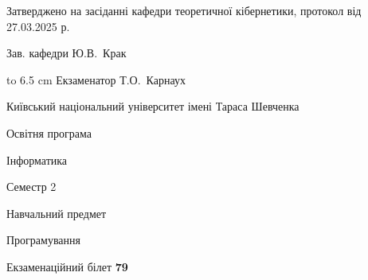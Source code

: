 \documentclass[12pt, ukrainian]{article}
\begin{document}
{\smallskip\smallskip \begin {scriptsize} Затверджено на засіданні кафедри теоретичної кібернетики, протокол   від   27.03.2025 р.\par\smallskip\smallskip\smallskip\smallskip
{\parbox {6.5 cm} {Зав. кафедри \dotfill Ю.В.~Крак}}\hspace {0.7cm} {\hbox to 6.5 cm { Екзаменатор \dotfill Т.О.~Карнаух}} \end{scriptsize}}
\newpage
{{\begin {scriptsize}\par
{ \center  Київський національний університет імені Тараса Шевченка \par}
{\parbox {5 cm}{Освітня програма \hfill}{\parbox {7 cm}{Інформатика\hfill}}\parbox {6 cm}{\hfill Семестр 2}}\par
{\parbox {5 cm} {Навчальний предмет \hfill}\parbox {7 cm}{Програмування \hfill}\parbox {6cm}{\hfill}\par}\vspace{-15pt} \end{scriptsize}}{\center Екзаменаційний білет \No \textbf { 79 }\par}}
\end{document}
